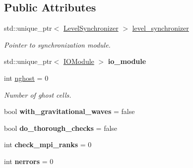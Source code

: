 \subsection*{Public Attributes}
\begin{DoxyCompactItemize}
\item 
\mbox{\label{classsledgehamr_1_1Sledgehamr_a08088a5d33fc94d5aff24ae0facae9d3}} 
std\+::unique\+\_\+ptr$<$ \mbox{\hyperlink{classsledgehamr_1_1LevelSynchronizer}{Level\+Synchronizer}} $>$ \mbox{\hyperlink{classsledgehamr_1_1Sledgehamr_a08088a5d33fc94d5aff24ae0facae9d3}{level\+\_\+synchronizer}}
\begin{DoxyCompactList}\small\item\em Pointer to synchronization module. \end{DoxyCompactList}\item 
\mbox{\label{classsledgehamr_1_1Sledgehamr_af8c1d908670c8e7a86039634003ca9d2}} 
std\+::unique\+\_\+ptr$<$ \mbox{\hyperlink{classsledgehamr_1_1IOModule}{I\+O\+Module}} $>$ {\bfseries io\+\_\+module}
\item 
\mbox{\label{classsledgehamr_1_1Sledgehamr_a8b820992141c3e1fc4581b39b86fc8a1}} 
int \mbox{\hyperlink{classsledgehamr_1_1Sledgehamr_a8b820992141c3e1fc4581b39b86fc8a1}{nghost}} = 0
\begin{DoxyCompactList}\small\item\em Number of ghost cells. \end{DoxyCompactList}\item 
\mbox{\label{classsledgehamr_1_1Sledgehamr_affbe4047a4e7222e61195b4241ff4bb1}} 
bool {\bfseries with\+\_\+gravitational\+\_\+waves} = false
\item 
\mbox{\label{classsledgehamr_1_1Sledgehamr_a6a06d1bf6d7436d39e8f0a809b8293a2}} 
bool {\bfseries do\+\_\+thorough\+\_\+checks} = false
\item 
\mbox{\label{classsledgehamr_1_1Sledgehamr_ad2185aafc7053f34e7325584ff808eb3}} 
int {\bfseries check\+\_\+mpi\+\_\+ranks} = 0
\item 
\mbox{\label{classsledgehamr_1_1Sledgehamr_abec8e744b285c224cc3cba2f23dda06d}} 
int {\bfseries nerrors} = 0
\end{DoxyCompactItemize}
